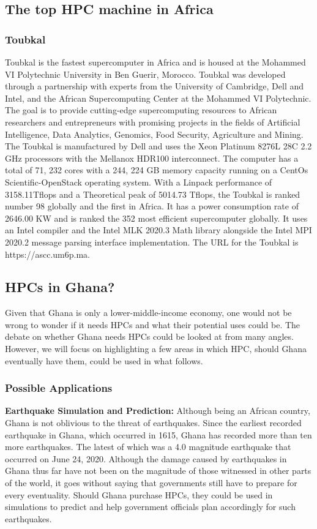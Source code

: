\documentclass{article}
\begin{document}
\newpage

\subsection{The top HPC machine in Africa}
\subsubsection{Toubkal}
Toubkal is the fastest supercomputer in Africa and is housed at the Mohammed VI Polytechnic University in Ben Guerir, Morocco. Toubkal was developed through a partnership with experts from the University of Cambridge, Dell and Intel, and the African Supercomputing Center at the Mohammed VI Polytechnic. The goal is to provide cutting-edge supercomputing resources to African researchers and entrepreneurs with promising projects in the fields of Artificial Intelligence, Data Analytics, Genomics, Food Security, Agriculture and Mining. The Toubkal is manufactured by Dell and uses the Xeon Platinum 8276L 28C 2.2 GHz processors with the Mellanox HDR100 interconnect. The computer has a total of 71, 232 cores with a 244, 224 GB memory capacity running on a CentOs Scientific-OpenStack operating system. With a Linpack performance of 3158.11Tflops and a Theoretical peak of 5014.73 Tflops, the Toubkal is ranked number 98 globally and the first in Africa. It has a power consumption rate of 2646.00 KW and is ranked the 352 most efficient supercomputer globally. It uses an Intel compiler and the Intel MLK 2020.3 Math library alongside the Intel MPI 2020.2 message parsing interface implementation. The URL for the Toubkal is https://ascc.um6p.ma. 


\subsection{HPCs in Ghana?}
Given that Ghana is only a lower-middle-income economy, one would not be wrong to wonder if it needs HPCs and what their potential uses could be. The debate on whether Ghana needs HPCs could be looked at from many angles. However, we will focus on highlighting a few areas in which HPC, should Ghana eventually have them, could be used in what follows. 
\subsubsection{Possible Applications}

\textbf{Earthquake Simulation and Prediction: }
Although being an African country, Ghana is not oblivious to the threat of earthquakes. Since the earliest recorded earthquake in Ghana, which occurred in 1615, Ghana has recorded more than ten more earthquakes. The latest of which was a 4.0 magnitude earthquake that occurred on June 24, 2020. Although the damage caused by earthquakes in Ghana thus far have not been on the magnitude of those witnessed in other parts of the world, it goes without saying that governments still have to prepare for every eventuality. Should Ghana purchase HPCs, they could be used in simulations to predict and help government officials plan accordingly for such earthquakes. \\
\end{document}
